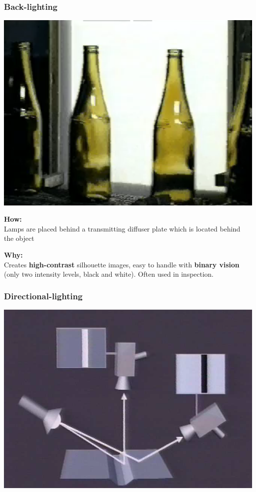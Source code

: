 \documentclass[a4paper, fontsize=8pt, landscape, DIV=1]{scrartcl}
\begin{document}
\begin{multicols*}{4}
		\subsubsection{Back-lighting}
		\begin{center}
			\includegraphics[width=0.7\columnwidth,]{images/ImageAcq/back_lighting.png}\\
		\end{center}
		
		\textbf{How:}\\
		Lamps are placed behind a transmitting diffuser plate which is located behind the object
		\par 
		\textbf{Why:}\\
		Creates \textbf{high-contrast} silhouette images, easy to handle with \textbf{binary vision} (only two intensity levels, black and white). Often used in inspection.
	
		\subsubsection{Directional-lighting}
		\begin{center}
			\includegraphics[width=0.7\columnwidth,]{images/ImageAcq/directional_lighting.png}\\
		\end{center}
	

\end{multicols*}
\end{document}
